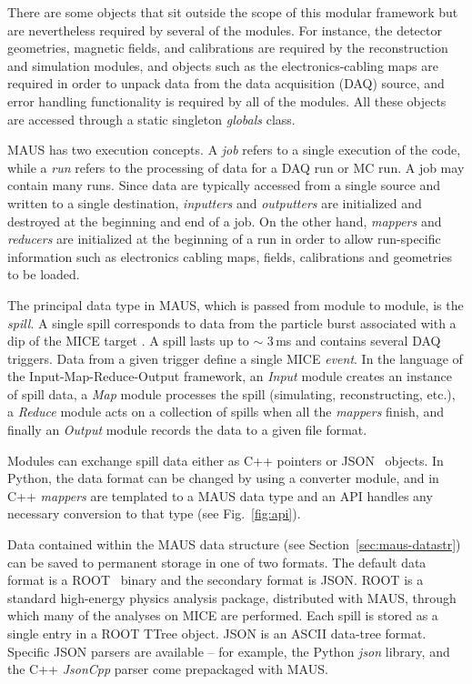 \documentclass[11pt,a4paper]{article}
\begin{document}
There are some objects that sit outside the scope of this modular framework but are nevertheless required by several of the modules. For instance,  the detector geometries, magnetic fields, and calibrations are required by the reconstruction and simulation modules, and objects such as the electronics-cabling maps are required in order to unpack data from the data acquisition (DAQ) source, and error handling functionality is required by all of the modules. All these objects are accessed through a static singleton \emph{globals} class. 

MAUS has two execution concepts. A \emph{job} refers to a single execution of the code, while a \emph{run} refers to the processing of data for a DAQ run or MC run. A job may contain many runs. Since data are typically accessed from a single source and written to a single destination, \textit{inputters} and \textit{outputters} are initialized and destroyed at the beginning and end of a job. On the other hand, \textit{mappers} and \textit{reducers} are initialized at the beginning of a run in order to allow run-specific information such as electronics cabling maps, fields, calibrations and geometries to be loaded.

The principal data type in MAUS, which is passed from module to module, is the \emph{spill}. A single spill corresponds to  data from the particle burst associated with a dip of the MICE target \cite{BeamlineJINST}. A spill lasts up to $\sim$ 3\,ms and contains several DAQ triggers.  Data from a given trigger define a single MICE \emph{event}. In the language of the Input-Map-Reduce-Output framework, an \textit{Input} module creates an instance of spill data, a \textit{Map} module processes the spill (simulating, reconstructing, etc.), a \textit{Reduce} module acts on a collection of spills when all the \textit{mappers} finish, and finally an \textit{Output} module records the data to a given file format.

Modules can exchange spill data either as C++ pointers or JSON~\cite{JSON} objects. In Python, the data format can be changed by using a converter module, and in C++ \textit{mappers} are templated to a MAUS data type and an API  handles any necessary conversion to that type (see Fig.~\ref{fig:api}). 


Data contained within the MAUS data structure (see Section~\ref{sec:maus-datastr}) can be saved to permanent storage in one of two formats. The default data format is a ROOT~\cite{ROOT} binary and the secondary format is JSON. ROOT is a standard high-energy physics analysis package, distributed with MAUS, through which many of the analyses on MICE are performed. Each spill is stored as a single entry in a ROOT TTree object.  JSON is an ASCII data-tree format. Specific JSON parsers are available -- for example, the Python \emph{json} library, and the C++ \emph{JsonCpp} \cite{JSONCPP} parser come prepackaged with MAUS. 
\end{document}
